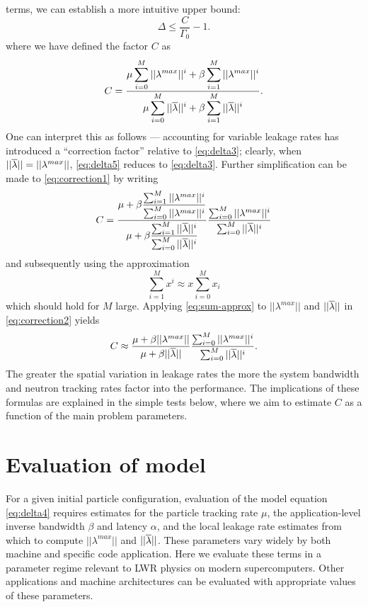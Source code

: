 terms, we can establish a more intuitive upper bound:
\begin{equation}
  \label{eq:delta5}
  \Delta \le \frac{C}{\Gamma_0} - 1.
\end{equation}
where we have defined the factor $C$ as
\begin{equation}
  \label{eq:correction1}
  C = \frac{\displaystyle \mu \sum_{i=0}^M ||\lambda^{max}||^i + \beta
    \sum_{i=1}^M ||\lambda^{max}||^i}{\displaystyle \mu \sum_{i=0}^M ||\overline{\lambda}||^i
    + \beta\sum_{i=1}^M ||\overline{\lambda}||^i}.
\end{equation}
One can interpret this as follows --- accounting for variable leakage rates has
introduced a ``correction factor'' relative to \eqref{eq:delta3}; clearly, when
$||\overline{\lambda}|| = ||\lambda^{max}||$, \eqref{eq:delta5} reduces to
\eqref{eq:delta3}. Further simplification can be made to \eqref{eq:correction1}
by writing
\begin{equation}
  \label{eq:correction2}
  C = \frac{\displaystyle \mu + \beta \frac{\sum_{i=1}^M
      ||\lambda^{max}||^i}{\sum_{i=0}^M ||\lambda^{max}||^i}}{\displaystyle \mu
    + \beta \frac{\sum_{i=1}^M ||\overline{\lambda}||^i}{\sum_{i=0}^M ||\overline{\lambda}||^i}}
  \frac{\sum_{i=0}^M ||\lambda^{max}||^i}{\sum_{i=0}^M ||\overline{\lambda}||^i}
\end{equation}
and subsequently using the approximation
\begin{equation}
  \label{eq:sum-approx}
  \sum_{i=1}^M x^i \approx x \sum_{i=0}^M x_i
\end{equation}
which should hold for $M$ large. Applying \eqref{eq:sum-approx} to
$||\lambda^{max}||$ and $||\overline{\lambda}||$ in \eqref{eq:correction2} yields
\begin{equation}
  \label{eq:correction3}
  C \approx \frac{\mu + \beta ||\lambda^{max}||}{\mu + \beta ||\overline{\lambda}||}
  \frac{\sum_{i=0}^M ||\lambda^{max}||^i}{\sum_{i=0}^M ||\overline{\lambda}||^i}.
\end{equation}
The greater the spatial variation in leakage rates the more the system bandwidth
and neutron tracking rates factor into the performance. The implications of
these formulas are explained in the simple tests below, where we aim to estimate
$C$ as a function of the main problem parameters.

\section{Evaluation of model}
\label{sec:domain-decomp-evaluation}

For a given initial particle configuration, evaluation of the model equation
\eqref{eq:delta4} requires estimates for the particle tracking rate $\mu$, the
application-level inverse bandwidth $\beta$ and latency $\alpha$, and the local
leakage rate estimates from which to compute $||\lambda^{max}||$ and
$||\overline{\lambda}||$. These parameters vary widely by both machine and specific code
application. Here we evaluate these terms in a parameter regime relevant to LWR
physics on modern supercomputers. Other applications and machine architectures
can be evaluated with appropriate values of these parameters.

